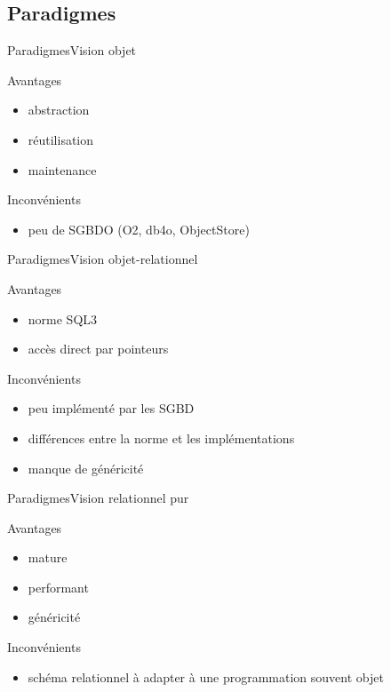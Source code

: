 \subsection{Paradigmes}
\begin{frame}{Paradigmes}{Vision objet}
  \begin{block}{Avantages}
    \begin{itemize}
      \item abstraction
      \item réutilisation
      \item maintenance
    \end{itemize}
  \end{block}
  \begin{block}{Inconvénients}
    \begin{itemize}
      \item peu de SGBDO (O2, db4o, ObjectStore)
    \end{itemize}
  \end{block}
\end{frame}

\begin{frame}{Paradigmes}{Vision objet-relationnel}
  \begin{block}{Avantages}
    \begin{itemize}
      \item norme SQL3
      \item accès direct par pointeurs
    \end{itemize}
  \end{block}
  \begin{block}{Inconvénients}
    \begin{itemize}
      \item peu implémenté par les SGBD
      \item différences entre la norme et les implémentations
      \item manque de généricité
    \end{itemize}
  \end{block}
\end{frame}

\begin{frame}{Paradigmes}{Vision relationnel pur}
  \begin{block}{Avantages}
    \begin{itemize}
      \item mature
      \item performant
      \item généricité
    \end{itemize}
  \end{block}
  \begin{block}{Inconvénients}
    \begin{itemize}
      \item schéma relationnel à adapter à une programmation souvent objet
    \end{itemize}
  \end{block}
\end{frame}

